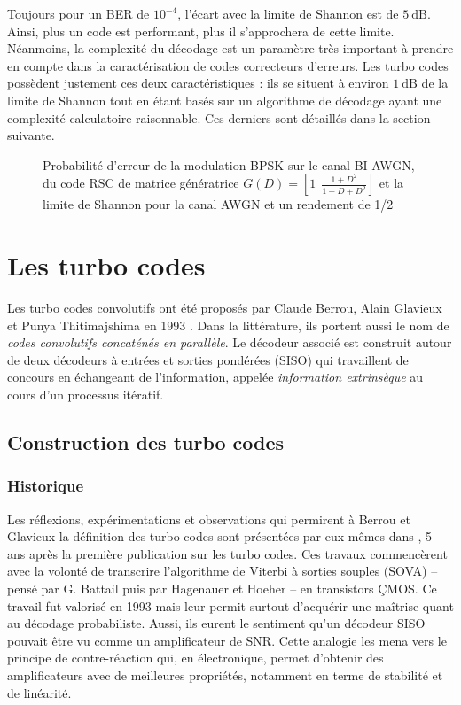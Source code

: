 Toujours pour un BER de $10 ^{-4}$, l'écart avec la limite de Shannon est de $5~\text{dB}$. Ainsi, plus un code est performant, 
plus il s'approchera de cette limite. Néanmoins, la complexité du décodage est un paramètre très important à prendre en
compte dans la caractérisation de codes correcteurs d'erreurs. Les turbo codes possèdent justement ces deux caractéristiques : ils se 
situent à environ $1~\text{dB}$ de la limite de Shannon tout en étant basés sur un algorithme de décodage ayant une complexité 
calculatoire raisonnable. Ces derniers sont détaillés dans la section suivante.


\begin{figure}[!h]
	\centering
	
	\caption{\label{fig:berBPSK} Probabilité d'erreur de la modulation BPSK sur le canal BI-AWGN, du code RSC de matrice génératrice $G(D) = \left[ 1 ~~\frac{1+D^2}{1+D+D^2} \right]$ et la limite de Shannon pour la canal AWGN et un rendement de 1/2} 
\end{figure}
		
		
\section{Les turbo codes}
Les turbo codes convolutifs ont été proposés par Claude Berrou, Alain Glavieux et Punya Thitimajshima en 1993 
\cite{berrouTC}. Dans la littérature, ils portent aussi le nom de \emph{codes convolutifs concaténés en parallèle}. 
Le décodeur associé est construit autour de deux décodeurs à entrées et sorties pondérées (SISO) qui travaillent de concours en échangeant de 
l'information, appelée \emph{information extrinsèque} au cours d'un processus itératif. 

\subsection{Construction des turbo codes}
\subsubsection{Historique}
Les réflexions, expérimentations et observations qui permirent à Berrou et Glavieux la définition des turbo codes sont 
présentées par eux-mêmes dans \cite{berrou1998reflections}, 5 ans après la première publication sur les turbo codes. 
Ces travaux commencèrent avec la volonté de transcrire l'algorithme de Viterbi à sorties souples (SOVA) -- pensé par G. 
Battail \cite{Battail1987} puis par Hagenauer et Hoeher \cite{HagenHoerViter} -- en transistors ÇMOS. Ce travail fut 
valorisé en 1993 \cite{BerrouHardwareSOVA} mais leur permit surtout d'acquérir une maîtrise quant au décodage 
probabiliste. Aussi, ils eurent le sentiment qu'un décodeur SISO pouvait être vu comme un amplificateur de SNR. Cette 
analogie les mena vers le principe de contre-réaction qui, en électronique, permet d'obtenir des amplificateurs avec de 
meilleures propriétés, notamment en terme de stabilité et de linéarité.

